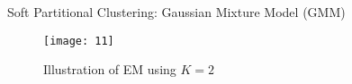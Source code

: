 \documentclass[compress,oilve]{beamer}
\begin{document}
\begin{frame}{Soft Partitional Clustering: Gaussian Mixture Model (GMM)}
\begin{figure}
	\centering
	\texttt{[image: 11]}
	\caption{Illustration of EM using $K = 2$}
\end{figure}
\end{frame}





\end{document}
